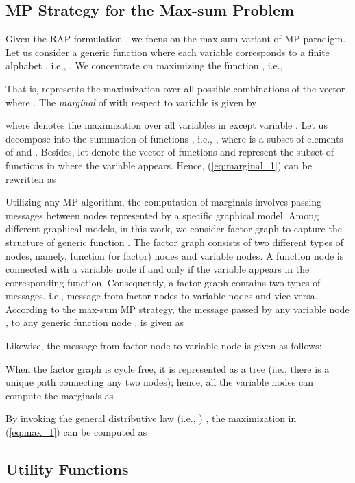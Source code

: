 \documentclass[twocolumn,10pt]{IEEEtran}
\begin{document}
\subsection{MP Strategy for the Max-sum Problem} \label{sec:MP_intro}

Given the RAP formulation , we focus on the max-sum variant \cite{max-sum} of MP paradigm. Let us consider a generic function  where each variable  corresponds to a finite alphabet , i.e., . We concentrate on maximizing the function , i.e.,
 
That is,  represents the maximization over all possible combinations of the vector  where . The \textit{marginal} of  with respect to variable  is given by

where  denotes the maximization over all variables in  except variable . Let us decompose  into the summation of  functions
, i.e., , where  is a subset of elements of  and . Besides, let  denote the vector of  functions and  represent the subset of functions in  where the variable  appears.  Hence, (\ref{eq:marginal_1}) can be rewritten as


Utilizing any MP algorithm, the computation of marginals involves passing messages between nodes represented by a specific graphical model. Among different graphical models, in this work, we consider factor graph \cite{bp_factor_graph} to capture the structure of generic function . The factor graph consists of two different types of nodes, namely, function (or factor) nodes and variable nodes. A function node is connected with a variable node if and only if the variable appears in the corresponding function. Consequently, a factor graph contains two types of messages, i.e., message from factor nodes to variable nodes and vice-versa. According to the max-sum MP strategy, the message passed by any variable node , to any generic function node , is given as

Likewise, the message from factor node  to variable node  is given as follows:


When the factor graph is cycle free, it is represented as a tree (i.e., there is a unique path connecting any two nodes); hence, all the variable nodes can compute the marginals as

By invoking the general distributive law (i.e., ) \cite{mp_distributive}, the maximization in (\ref{eq:max_1}) can be computed as 

\subsection{Utility Functions}
\end{document}
